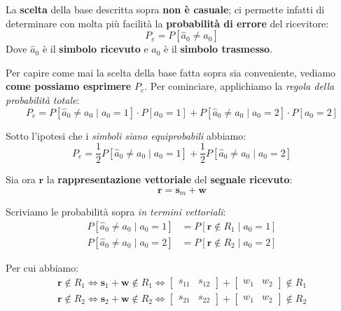 La \textbf{scelta} della base descritta sopra \textbf{non è casuale}; ci permette infatti
di determinare con molta più facilità la \textbf{probabilità di errore} del ricevitore:
\[
    P_e = P[\hat{a}_0 \ne a_{0}]
\]
Dove $\hat{a}_0$ è il \textbf{simbolo ricevuto} e $a_{0}$ è il \textbf{simbolo trasmesso}.

Per capire come mai la scelta della base fatta sopra sia conveniente, vediamo 
\textbf{come possiamo esprimere} $P_e$.
Per cominciare, applichiamo la \textit{regola della probabilità totale}:
\[
    P_e = P[\hat{a}_0 \ne a_{0} \;|\; a_{0} = 1 ]\cdot P[a_{0} = 1] + 
         P[\hat{a}_0 \ne a_{0} \;|\; a_{0} = 2 ]\cdot P[a_{0} = 2]
\]

Sotto l'ipotesi che i \textit{simboli siano equiprobabili} abbiamo:
\[
    P_e = \frac{1}{2} P[\hat{a}_0 \ne a_{0} \;|\; a_{0} = 1 ] + 
         \frac{1}{2} P[\hat{a}_0 \ne a_{0} \;|\; a_{0} = 2 ]
\]

Sia ora $\mathbf{r}$ la \textbf{rappresentazione vettoriale} del \textbf{segnale ricevuto}:
\[
    \mathbf{r} = \mathbf{s}_m + \mathbf{w}
\]

Scriviamo le probabilità sopra \textit{in termini vettoriali}:
\[
    \begin{aligned}
        P[\hat{a}_0 \ne a_{0} \;|\; a_{0} = 1 ] &= P[\mathbf{r} \not\in R_{1} \;|\; a_{0} = 1] \\
        P[\hat{a}_0 \ne a_{0} \;|\; a_{0} = 2 ] &= P[\mathbf{r} \not\in R_{2} \;|\; a_{0} = 2]
    \end{aligned}
\]

Per cui abbiamo:
\[
    \begin{aligned}
        \mathbf{r} \not\in R_{1} \Longleftrightarrow \mathbf{s}_1 + \mathbf{w} \not\in R_{1} 
        \Longleftrightarrow \begin{bmatrix} s_{11} & s_{12} \end{bmatrix} + 
        \begin{bmatrix} w_{1} & w_{2} \end{bmatrix} \not\in R_{1} \\
        \mathbf{r} \not\in R_{2} \Longleftrightarrow \mathbf{s}_2 + \mathbf{w} \not\in R_{2} 
        \Longleftrightarrow \begin{bmatrix} s_{21} & s_{22} \end{bmatrix} + 
        \begin{bmatrix} w_{1} & w_{2} \end{bmatrix} \not\in R_{2}
    \end{aligned}
\]

